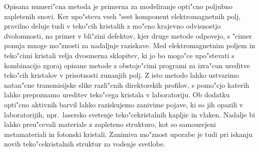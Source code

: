 \documentclass[12pt,twoside,openright,final,a4paper]{report}
\begin{document}
Opisana numeri"cna metoda je primerna za modeliranje opti"cno poljubno zapletenih snovi. 
Ker upo"steva vseh "sest komponent elektromagnetnih polj, pravilno deluje tudi v teko"cih kristalih z mo"cno krajevno odvisnostjo dvolomnosti, na primer v bli"zini defektov, kjer druge metode odpovejo, s "cimer ponuja mnoge mo"znosti za nadaljnje raziskave. 
Med elektromagnetnim poljem in teko"cimi kristali velja dvosmerna sklopitev, ki jo bo mogo"ce upo"stevati s kombinacijo zgoraj opisane metode z obstoje"cimi programi za izra"cun ureditve teko"cih kristalov v prisotnosti zunanjih polj. 
Z isto metodo lahko ustvarimo natan"cne transmisijske slike razli"cnih direktorskih profilov, s pomo"cjo katerih lahko prepoznamo ureditev teko"cega kristala v laboratoriju. 
Ob dodatku opti"cno aktivnih barvil lahko raziskujemo zanivime pojave, ki so jih opazili v laboratorijih, npr.~lasersko svetenje teko"cekristalnih kapljic in vlaken. 
Nadalje bi lahko preu"cevali materiale z zapleteno strukturo, kot so samourejeni metamateriali in fotonski kristali. 
Zanimiva mo"znost uporabe je tudi pri iskanju novih teko"cekristalnih struktur za vodenje svetlobe. 



\end{document}
